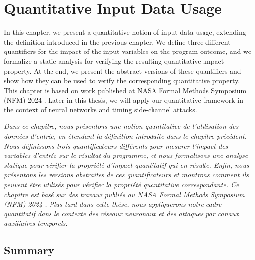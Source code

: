 
\setchapterpreamble[u]{\margintoc}
%


\chapter{Quantitative Input Data Usage}

\marginemptybox{5.8cm}

In this chapter, we present a quantitative notion of input data usage, extending the definition introduced in the previous chapter.
We define three different quantifiers for the impact of the input variables on the program outcome, and we formalize a static analysis for verifying the resulting quantitative impact property.
At the end, we present the abstract versions of these quantifiers and show how they can be used to verify the corresponding quantitative property.
This chapter is based on work published at NASA Formal Methods Symposium (NFM) 2024 .
Later in this thesis, we will apply our quantitative framework in the context of neural networks and timing side-channel attacks.

\frenchdiv

\emph{Dans ce chapitre, nous présentons une notion quantitative de l'utilisation des données d'entrée, en étendant la définition introduite dans le chapitre précédent. Nous définissons trois quantificateurs différents pour mesurer l'impact des variables d'entrée sur le résultat du programme, et nous formalisons une analyse statique pour vérifier la propriété d'impact quantitatif qui en résulte. Enfin, nous présentons les versions abstraites de ces quantificateurs et montrons comment ils peuvent être utilisés pour vérifier la propriété quantitative correspondante. Ce chapitre est basé sur des travaux publiés au NASA Formal Methods Symposium (NFM) 2024 \cite{Mazzucato2024b}. Plus tard dans cette thèse, nous appliquerons notre cadre quantitatif dans le contexte des réseaux neuronaux et des attaques par canaux auxiliaires temporels.}





\section{Summary}

